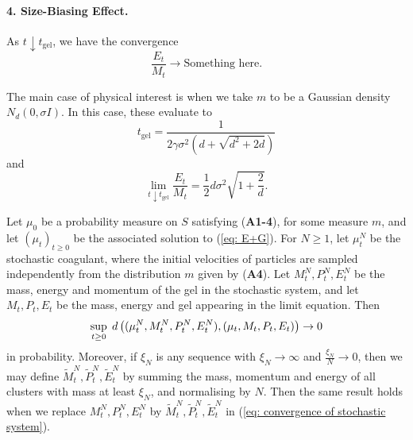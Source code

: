 \begin{theorem}
\paragraph{4. Size-Biasing Effect.} As $t\downarrow t_\text{gel}$, we have the convergence \begin{equation}
    \frac{E_t}{M_t}\rightarrow \text{Something here}.
\end{equation}


The main case of physical interest is when we take $m$ to be a Gaussian density $N_d(0, \sigma I)$. In this case, these evaluate to \begin{equation}
    \label{eq: formula of tgel} t_\text{gel} = \frac{1}{2\gamma \sigma^2(d+\sqrt{d^2+2d})}
\end{equation} and \begin{equation}
    \lim_{t\downarrow t_\text{gel}}\frac{E_t}{M_t}=\frac{1}{2}d\sigma^2\sqrt{1+\frac{2}{d}}.
\end{equation} \end{theorem}

\begin{theorem} \label{thrm: convergence of stochastic coagulent} Let $\mu_0$ be a probability measure on $S$ satisfying (\textbf{A1-4}), for some measure $m$, and let $(\mu_t)_{t\ge 0}$ be the associated solution to (\ref{eq: E+G}). For $N\ge 1$, let $\mu^N_t$ be the stochastic coagulant, where the initial velocities of particles are sampled independently from the distribution $m$ given by (\textbf{A4}). Let $M^N_t, P^N_t, E^N_t$ be the mass, energy and momentum of the gel in the stochastic system, and let $M_t, P_t, E_t$ be the mass, energy and gel appearing in the limit equation. Then \begin{equation} \label{eq: convergence of stochastic system}
    \sup_{t\ge 0}\hspace{0.1cm}d\left((\mu^N_t, M^N_t, P^N_t, E^N_t),(\mu_t, M_t, P_t, E_t)\right) \rightarrow 0
\end{equation} in probability. Moreover, if $\xi_N$ is any sequence with $\xi_N\rightarrow \infty$ and $\frac{\xi_N}{N}\rightarrow 0$, then we may define $\widetilde{M}^N_t, \widetilde{P}^N_t, \widetilde{E}^N_t$ by summing the mass, momentum and energy of all clusters with mass at least $\xi_N$, and normalising by $N$. Then the same result holds when we replace $M^N_t, P^N_t, E^N_t$ by $\widetilde{M}^N_t, \widetilde{P}^N_t, \widetilde{E}^N_t$ in (\ref{eq: convergence of stochastic system}).
\end{theorem}